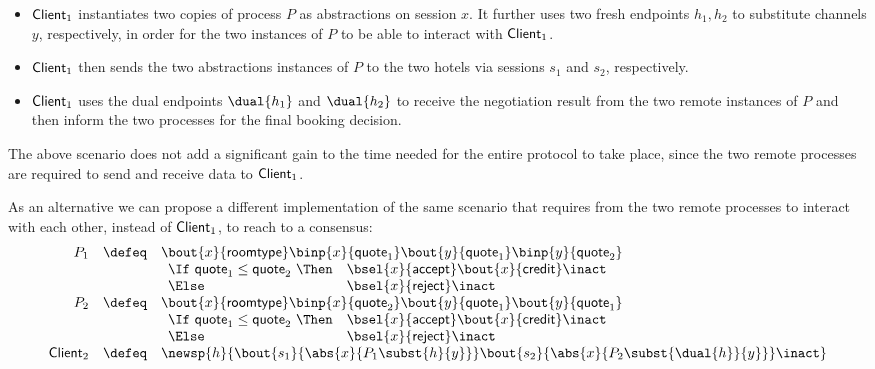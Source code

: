 \begin{example}
\begin{itemize}
	\item	$\mathsf{Client}_1$ instantiates two copies of process $P$ as abstractions
		on session $x$. It further uses two
		fresh endpoints $h_1, h_2$ to substitute channels $y$, respectively,
		in order for the two instances of $P$ to be able to interact
		with $\mathsf{Client}_1$.
	
	\item	$\mathsf{Client}_1$ then sends the two abstractions instances of $P$
		to the two hotels via sessions $s_1$ and $s_2$, respectively.

	\item	$\mathsf{Client}_1$ uses the dual endpoints $\dual{h_1}$ and $\dual{h_2}$
		to receive the negotiation
		result from the two remote instances of $P$ and then inform the two
		processes for the final booking decision.
\end{itemize}

The above scenario does not add a significant gain
to the time needed for the entire protocol to take
place, since the two remote processes are required
to send and receive data to $\mathsf{Client}_1$.

As an alternative we can propose a different implementation
of the same scenario that requires from the two
remote processes to interact with each other,
instead of $\mathsf{Client}_1$, to reach to a consensus:
%
\[
	\begin{array}{rcl}
		P_1 &\defeq&	\bout{x}{\rtype} \binp{x}{\Quote_1} \bout{y}{\Quote_1} \binp{y}{\Quote_2}\\
			&&
				\begin{array}{ll}
					\If\ \Quote_1 \leq \Quote_2\ \Then & \bsel{x}{\accept} \bout{x}{\creditc} \inact\\
					\Else & \bsel{x}{\reject} \inact
				\end{array}
		\\
		P_2 &\defeq&	\bout{x}{\rtype} \binp{x}{\Quote_2} \bout{y}{\Quote_1} \bout{y}{\Quote_1}\\
			&&
				\begin{array}{ll}
					\If\ \Quote_1 \leq \Quote_2\ \Then & \bsel{x}{\accept} \bout{x}{\creditc} \inact\\
					\Else & \bsel{x}{\reject} \inact
				\end{array}
		\\
		\Client_2 &\defeq& \newsp{h}{\bout{s_1}{\abs{x}{P_1 \subst{h}{y}}} \bout{s_2}{\abs{x}{P_2 \subst{\dual{h}}{y}}} \inact}
	\end{array}
\]
\end{example}


